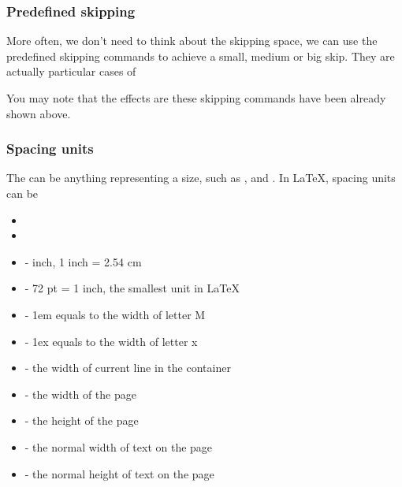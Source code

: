 \begin{frame}[fragile]
    \frametitle{Predefined skipping}

    More often\footnotemark[1], we don't need to think about the skipping space, we can use the predefined skipping commands to achieve a small, medium or big skip. They are actually particular cases of \LC{\vspace}

    \begin{command}
        \LC{\smallskip}\smallskip

        \LC{\medskip}\medskip

        \LC{\bigskip}\bigskip
    \end{command}

    You may note that the effects are these skipping commands have been already shown above.
\end{frame}

\begin{frame}
    \frametitle{Spacing units}
    The  can be anything representing a size, such as \structure{1cm}, \structure{2em} and \structure{10pt}. In \LaTeX, spacing units can be
    \begin{itemize}
        \item {}
        \item {}
        \item {} - inch, 1 inch = 2.54 cm
        \item {} - 72 pt = 1 inch, the smallest unit in \LaTeX
        \item {} - 1em equals to the width of letter M
        \item {} - 1ex equals to the width of letter x
        \item \LC{\linewidth} - the width of current line in the container
        \item \LC{\pagewidth} - the width of the page
        \item \LC{\pageheight} - the height of the page
        \item \LC{\textwidth} - the normal width of text on the page
        \item \LC{\textheight} - the normal height of text on the page
    \end{itemize}
\end{frame}

